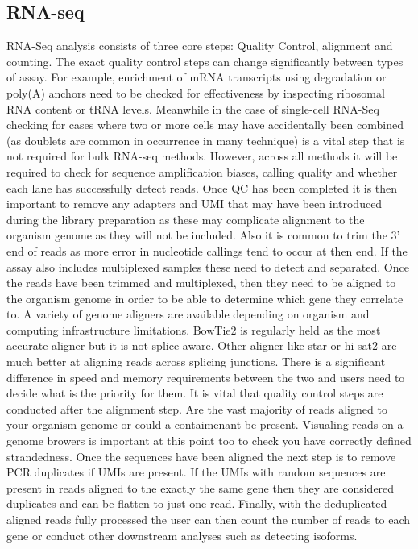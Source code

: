 \documentclass{SBCbookchapter}
\begin{document}
\subsection{RNA-seq}
RNA-Seq analysis consists of three core steps: Quality Control, alignment and counting. The exact quality control steps can change significantly between types of assay. For example, enrichment of mRNA transcripts using degradation or poly(A) anchors need to be checked for effectiveness by inspecting ribosomal RNA content or tRNA levels. Meanwhile in the case of single-cell RNA-Seq checking for cases where two or more cells may have accidentally been combined (as doublets are common in occurrence in many technique) is a vital step that is not required for bulk RNA-seq methods. However, across all methods it will be required to check for sequence amplification biases, calling quality and whether each lane has successfully detect reads. Once QC has been completed it is then important to remove any adapters and UMI that may have been introduced during the library preparation as these may complicate alignment to the organism genome as they will not be included. Also it is common to trim the 3' end of reads as more error in nucleotide callings tend to occur at then end. If the assay also includes multiplexed samples these need to detect and separated. Once the reads have been trimmed and multiplexed, then they need to be aligned to the organism genome in order to be able to determine which gene they correlate to. A variety of genome aligners are available depending on organism and computing infrastructure limitations.  BowTie2 is regularly held as the most accurate aligner but it is not splice aware. Other aligner like star or hi-sat2 are much better at aligning reads across splicing junctions. There is a significant difference in speed and memory requirements between the two and users need to decide what is the priority for them. It is vital that quality control steps are conducted after the alignment step. Are the vast majority of reads aligned to your organism genome or could a contaimenant be present. Visualing reads on a genome browers is important at this point too to check you have correctly defined strandedness. Once the sequences have been aligned the next step is to remove PCR duplicates if UMIs are present. If the UMIs with random sequences are present in reads aligned to the exactly the same gene then they are considered duplicates and can be flatten to just one read. Finally, with the deduplicated aligned reads fully processed the user can then count the number of reads to each gene or conduct other downstream analyses such as detecting isoforms.
\end{document}
